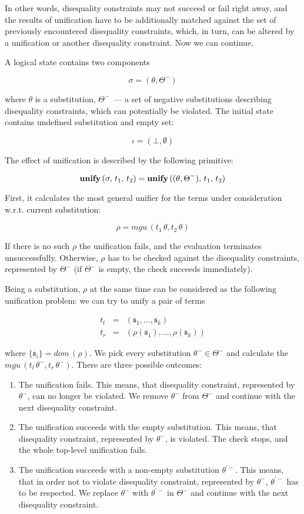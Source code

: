 In other words, disequality constraints may not succeed or fail right away, and the results of unification have to be additionally matched against the set of 
previously encountered disequality constraints, which, in turn, can be altered by a unification or another disequality constraint. Now we can continue.

A logical state contains two components

$$
\sigma=(\theta,\Theta^-)
$$

\noindent where $\theta$ is a substitution, $\Theta^-$~--- a set of negative substitutions describing disequality constraints, 
which can potentially be violated. The initial state contains undefined substitution and empty set:

$$
\iota=(\bot,\emptyset)
$$

The effect of unification is described by the following primitive:

$$
{\bf unify}\,(\sigma,\,t_1,\,t_2)={\bf unify}\,((\theta,\Theta^-),\,t_1,\,t_2)
$$

First, it calculates the most general unifier for the terms under consideration w.r.t. current substitution:

$$
\rho=mgu\,(t_1\,\theta,t_2\,\theta)
$$

If there is no such $\rho$ the unification fails, and the evaluation terminates unsuccessfully. Otherwise,
$\rho$ has to be checked against the disequality constraints, represented by $\Theta^-$ (if $\Theta^-$ is empty, the
check succeeds immediately).

Being a substitution, $\rho$ at the same time can be considered as the following unification problem: we can try to unify a pair of terms 

$$
\begin{array}{rcl}
t_l&=&(\mathfrak s_1,\dots,\mathfrak s_k)\\
t_r&=&(\rho(\mathfrak s_1),\dots,\rho(\mathfrak s_k))
\end{array}
$$

\noindent where $\{\mathfrak s_i\}=dom\,(\rho)$. We pick every substitution $\theta^-\in\Theta^-$ and calculate 
the $mgu\,(t_l\,\theta^-,t_r\,\theta^-)$. There are three possible outcomes:

\begin{enumerate}
\item The unification fails. This means, that disequality constraint, represented by $\theta^-$, can no
longer be violated. We remove $\theta^-$ from $\Theta^-$ and continue with the next disequality constraint.
\item The unification succeeds with the empty substitution. This means, that 
disequality constraint, represented by $\theta^-$, is violated. The check stops, and the whole top-level 
unification fails.
\item The unification succeeds with a non-empty substitution $\theta^{\prime-}$. This means, that in order not to 
violate disequality constraint, represented by $\theta^-$, $\theta^{\prime-}$ has to be respected. We replace
$\theta^-$ with $\theta^{\prime-}$ in $\Theta^-$ and continue with the next disequality constraint.
\end{enumerate}

